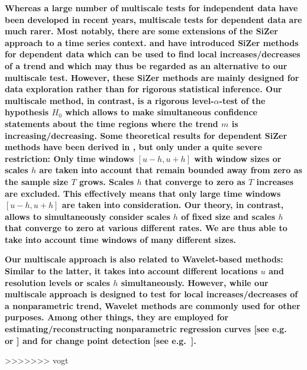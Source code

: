\documentclass[a4paper,12pt]{article}
\begin{document}
{\bf Whereas a large number of multiscale tests for independent data have been developed in recent years, multiscale tests for dependent data are much rarer. Most notably, there are some extensions of the SiZer approach to a time series context. \cite{Rondonotti2004} and \cite{Rondonotti2007} have introduced SiZer methods for dependent data which can be used to find local increases/decreases of a trend and which may thus be regarded as an alternative to our multiscale test. However, these SiZer methods are mainly designed for data exploration rather than for rigorous statistical inference. Our multiscale method, in contrast, is a rigorous level-$\alpha$-test of the hypo\-thesis $H_0$ which allows to make simultaneous confidence statements about the time regions where the trend $m$ is increasing/decreasing. Some theoretical results for dependent SiZer methods have been derived in \cite{ParkHannigKang2009}, but only under a quite severe restriction: Only time windows $[u-h,u+h]$ with window sizes or scales $h$ are taken into account that remain bounded away from zero as the sample size $T$ grows. Scales $h$ that converge to zero as $T$ increases are excluded. This effectively means that only large time windows $[u-h,u+h]$ are taken into consideration. Our theory, in contrast, allows to simultaneously consider scales $h$ of fixed size and scales $h$ that converge to zero at various different rates. We are thus able to take into account time windows of many different sizes.}

{\bf Our multiscale approach is also related to Wavelet-based methods: Similar to the latter, it takes into account different locations $u$ and resolution levels or scales $h$ simultaneously. However, while our multiscale approach is designed to test for local increases/decreases of a nonparametric trend, Wavelet methods are commonly used for other purposes. Among other things, they are employed for estimating/reconstructing nonparametric regression curves [see e.g.\ \cite{Donoho1995} or \cite{vonSachsMacGibbon2000}] and for change point detection [see e.g.\ \citet{ChoFryzlewicz2012}].}

>>>>>>> vogt

\end{document}
